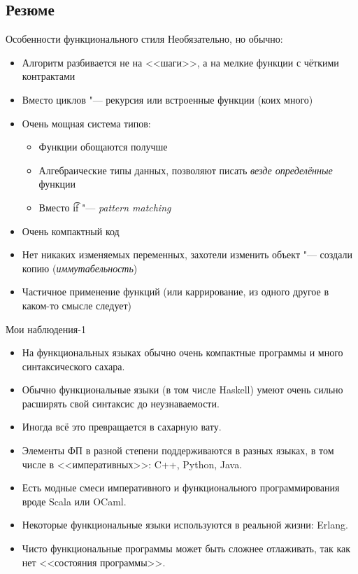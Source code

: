 \subsection{Резюме}

\begin{frame}
\end{frame}

\begin{frame}{Особенности функционального стиля}
	Необязательно, но обычно:
	\begin{itemize}
		\item Алгоритм разбивается не на <<шаги>>, а на мелкие функции с чёткими контрактами
		\item Вместо циклов "--- рекурсия или встроенные функции (коих много)
		\item Очень мощная система типов:
			\begin{itemize}
				\item Функции обощаются получше
				\item Алгебраические типы данных, позволяют писать \textit{везде определённые} функции
				\item Вместо \t{if} "--- \textit{pattern matching}
			\end{itemize}
		\item Очень компактный код
		\item Нет никаких изменяемых переменных, захотели изменить объект "--- создали копию (\textit{иммутабельность})
		\item Частичное применение функций (или каррирование, из одного другое в каком-то смысле следует)
	\end{itemize}
\end{frame}

\begin{frame}{Мои наблюдения-1}
	\begin{itemize}
		\item На функциональных языках обычно очень компактные программы и много синтаксического сахара.
		\item Обычно функциональные языки (в том числе Haskell) умеют очень сильно расширять свой синтаксис до неузнаваемости.
		\item Иногда всё это превращается в сахарную вату.
		\item Элементы ФП в разной степени поддерживаются в разных языках, в том числе в
			<<императивных>>: C++, Python, Java.
		\item Есть модные смеси императивного и функционального программирования вроде Scala или OCaml.
		\item Некоторые функциональные языки используются в реальной жизни: Erlang.
		\item Чисто функциональные программы может быть сложнее отлаживать, так как нет <<состояния программы>>.
	\end{itemize}
\end{frame}


